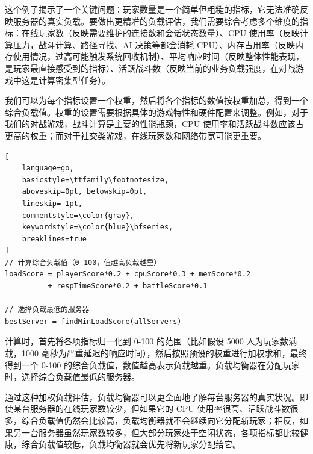 这个例子揭示了一个关键问题：玩家数量是一个简单但粗糙的指标，它无法准确反映服务器的真实负载。要做出更精准的负载评估，我们需要综合考虑多个维度的指标：在线玩家数（反映需要维护的连接数和会话状态数量）、CPU 使用率（反映计算压力，战斗计算、路径寻找、AI 决策等都会消耗 CPU）、内存占用率（反映内存使用情况，过高可能触发系统回收机制）、平均响应时间（反映整体性能表现，是玩家最直接感受到的指标）、活跃战斗数（反映当前的业务负载强度，在对战游戏中这是计算密集型任务）。

我们可以为每个指标设置一个权重，然后将各个指标的数值按权重加总，得到一个综合负载值。权重的设置需要根据具体的游戏特性和硬件配置来调整。例如，对于我们的对战游戏，战斗计算是主要的性能瓶颈，CPU 使用率和活跃战斗数应该占更高的权重；而对于社交类游戏，在线玩家数和网络带宽可能更重要。

\begin{tcolorbox}[title=综合负载值的计算方法]
\begin{lstlisting}[
    language=go,
    basicstyle=\ttfamily\footnotesize,
    aboveskip=0pt, belowskip=0pt,
    lineskip=-1pt,
    commentstyle=\color{gray},
    keywordstyle=\color{blue}\bfseries,
    breaklines=true
]
// 计算综合负载值（0-100，值越高负载越重）
loadScore = playerScore*0.2 + cpuScore*0.3 + memScore*0.2 
          + respTimeScore*0.2 + battleScore*0.1

// 选择负载最低的服务器
bestServer = findMinLoadScore(allServers)
\end{lstlisting}
\end{tcolorbox}

计算时，首先将各项指标归一化到 0-100 的范围（比如假设 5000 人为玩家数满载，1000 毫秒为严重延迟的响应时间），然后按照预设的权重进行加权求和，最终得到一个 0-100 的综合负载值，数值越高表示负载越重。负载均衡器在分配玩家时，选择综合负载值最低的服务器。

通过这种加权负载评估，负载均衡器可以更全面地了解每台服务器的真实状况。即使某台服务器的在线玩家数较少，但如果它的 CPU 使用率很高、活跃战斗数很多，综合负载值仍然会比较高，负载均衡器就不会继续向它分配新玩家；相反，如果另一台服务器虽然玩家数较多，但大部分玩家处于空闲状态，各项指标都比较健康，综合负载值较低，负载均衡器就会优先将新玩家分配给它。


